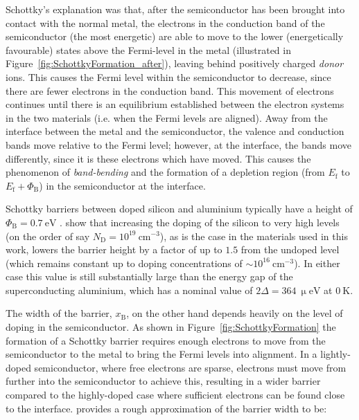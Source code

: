 \begin{figure}[t]
\begin{center}
\end{center}
\end{figure}
\par
Schottky's explanation was that, after the semiconductor has been brought into contact with the normal metal, the electrons in the conduction band of the semiconductor (the most energetic) are able to move to the lower (energetically favourable) states above the Fermi-level in the metal (illustrated in Figure~\ref{fig:SchottkyFormation_after}), leaving behind positively charged \textit{donor} ions. This causes the Fermi level within the semiconductor to decrease, since there are fewer electrons in the conduction band. This movement of electrons continues until there is an equilibrium established between the electron systems in the two materials (i.e. when the Fermi levels are aligned). Away from the interface between the metal and the semiconductor, the valence and conduction bands move relative to the Fermi level; however, at the interface, the bands move differently, since it is these electrons which have moved. This causes the phenomenon of \textit{band-bending} and the formation of a depletion region (from $E_{\mathrm{f}}$ to $E_{\mathrm{f}} + \varPhi_{\mathrm{B}}$) in the semiconductor at the interface.
\par
Schottky barriers between doped silicon and aluminium typically have a height of $\varPhi_{\mathrm{B}} = 0.7~\mathrm{eV}$ \parencite{Yu1970}. \textcite{Archer1970} show that increasing the doping of the silicon to very high levels (on the order of say $N_{\mathrm{D}} = 10^{19}~\mathrm{cm^{-3}}$), as is the case in the materials used in this work, lowers the barrier height by a factor of up to $1.5$ from the undoped level (which remains constant up to doping concentrations of $\sim 10^{16}~\mathrm{cm^{-3}}$). In either case this value is still substantially large than the energy gap of the superconducting aluminium, which has a nominal value of $2\varDelta = 364~\mathrm{\upmu eV}$ at $0~\mathrm{K}$.
\par 
The width of the barrier, $x_{\mathrm{B}}$, on the other hand depends heavily on the level of doping in the semiconductor. As shown in Figure~\ref{fig:SchottkyFormation} the formation of a Schottky barrier requires enough electrons to move from the semiconductor to the metal to bring the Fermi levels into alignment. In a lightly-doped semiconductor, where free electrons are sparse, electrons must move from further into the semiconductor to achieve this, resulting in a wider barrier compared to the highly-doped case where sufficient electrons can be found close to the interface. \textcite{Kittel2005} provides a rough approximation of the barrier width to be:
